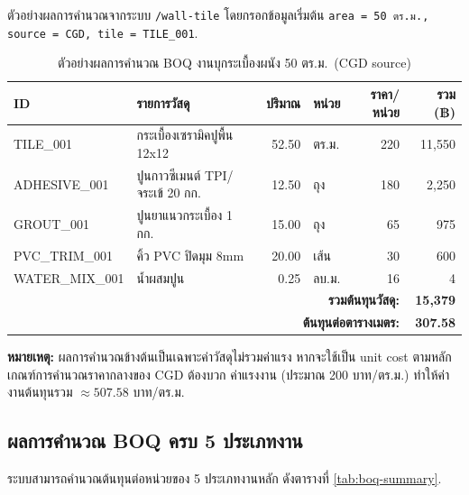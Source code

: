 ตัวอย่างผลการคำนวณจากระบบ \texttt{/wall-tile} โดยกรอกข้อมูลเริ่มต้น
\texttt{area = 50 ตร.ม., source = CGD, tile = TILE\_001}.

\begin{table}[H]
\centering
\caption{ตัวอย่างผลการคำนวณ BOQ งานบุกระเบื้องผนัง 50 ตร.ม.\ (CGD source)}
\label{tab:boq-walltile}
\begin{tabularx}{\textwidth}{l X r l r r}
\toprule
\textbf{ID} & \textbf{รายการวัสดุ} & \textbf{ปริมาณ} & \textbf{หน่วย} & \textbf{ราคา/หน่วย} & \textbf{รวม (฿)} \\
\midrule
TILE\_001       & กระเบื้องเซรามิคปูพื้น 12x12       & 52.50 & ตร.ม.   & 220 & 11{,}550 \\
ADHESIVE\_001   & ปูนกาวซีเมนต์ TPI/จระเข้ 20 กก.    & 12.50 & ถุง     & 180 &  2{,}250 \\
GROUT\_001      & ปูนยาแนวกระเบื้อง 1 กก.            & 15.00 & ถุง     &  65 &     975 \\
PVC\_TRIM\_001  & คิ้ว PVC ปิดมุม 8mm                 & 20.00 & เส้น    &  30 &     600 \\
WATER\_MIX\_001 & น้ำผสมปูน                          &  0.25 & ลบ.ม.  &  16 &       4 \\
\midrule
\multicolumn{5}{r}{\textbf{รวมต้นทุนวัสดุ:}}                    & \textbf{15{,}379} \\
\multicolumn{5}{r}{\textbf{ต้นทุนต่อตารางเมตร:}}              & \textbf{307.58} \\
\bottomrule
\end{tabularx}
\end{table}

\textbf{หมายเหตุ:} ผลการคำนวณข้างต้นเป็นเฉพาะค่าวัสดุไม่รวมค่าแรง
หากจะใช้เป็น unit cost ตามหลักเกณฑ์การคำนวณราคากลางของ CGD ต้องบวก
ค่าแรงงาน (ประมาณ 200 บาท/ตร.ม.) ทำให้ค่างานต้นทุนรวม
$\approx 507.58$ บาท/ตร.ม.

\subsection{ผลการคำนวณ BOQ ครบ 5 ประเภทงาน}

ระบบสามารถคำนวณต้นทุนต่อหน่วยของ 5 ประเภทงานหลัก ดังตารางที่
\ref{tab:boq-summary}.

